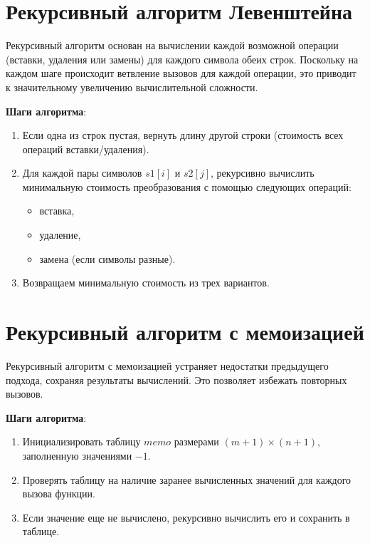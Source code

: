 \section{Рекурсивный алгоритм Левенштейна}

Рекурсивный алгоритм основан на вычислении каждой возможной операции (вставки, удаления или замены) для каждого символа обеих строк. Поскольку на каждом шаге происходит ветвление вызовов для каждой операции, это приводит к значительному увеличению вычислительной сложности.

\vspace{0.5cm}
\textbf{Шаги алгоритма}:
\begin{enumerate}
    \item Если одна из строк пустая, вернуть длину другой строки (стоимость всех операций вставки/удаления).
    \item Для каждой пары символов $s1[i]$ и $s2[j]$, рекурсивно вычислить минимальную стоимость преобразования с помощью следующих операций:
    \begin{itemize}
        \item вставка,
        \item удаление,
        \item замена (если символы разные).
    \end{itemize}
    \item Возвращаем минимальную стоимость из трех вариантов.
\end{enumerate}

\section{Рекурсивный алгоритм с мемоизацией}

Рекурсивный алгоритм с мемоизацией устраняет недостатки предыдущего подхода, сохраняя результаты вычислений. Это позволяет избежать повторных вызовов.

\vspace{0.5cm}
\textbf{Шаги алгоритма}:
\begin{enumerate}
    \item Инициализировать таблицу $memo$ размерами $(m+1) \times (n+1)$, заполненную значениями $-1$.
    \item Проверять таблицу на наличие заранее вычисленных значений для каждого вызова функции.
    \item Если значение еще не вычислено, рекурсивно вычислить его и сохранить в таблице.
\end{enumerate}


